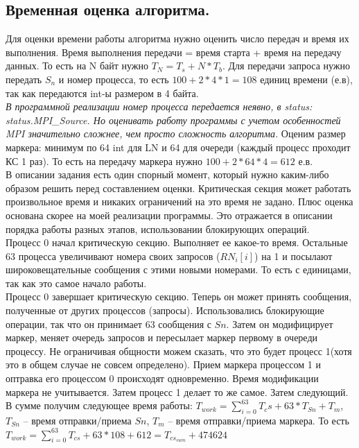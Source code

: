 \documentclass{article}
\begin{document}
\subsection{Временная оценка алгоритма.}
Для оценки времени работы алгоритма нужно оценить число передач и время их выполнения. Время выполнения передачи = время старта + время на передачу данных. То есть на N байт нужно $T_N = T_s + N * T_b$. Для передачи запроса нужно передать $S_n$ и номер процесса, то есть $100 + 2 * 4 * 1 = 108$ единиц времени (е.в), так как передаются int-ы размером в 4 байта.\\ \textit{В программной реализации номер процесса передается неявно, в status: status.MPI\_Source. Но оценивать работу программы с учетом особенностей MPI значительно сложнее, чем просто сложность алгоритма.}
Оценим размер маркера: минимум по 64 int для LN и 64 для очереди (каждый процесс проходит КС 1 раз). То есть на передачу маркера нужно $100 + 2 * 64 * 4 = 612$ е.в.\\
В описании задания есть один спорный момент, который нужно каким-либо образом решить перед составлением оценки. Критическая секция может работать произвольное время и никаких ограничений на это время не задано. Плюс оценка основана скорее на моей реализации программы. Это отражается в описании порядка работы разных этапов, использовании блокирующих операций.\\
Процесс 0 начал критическую секцию. Выполняет ее какое-то время. Остальные 63 процесса увеличивают номера своих запросов ($RN_i[i]$) на 1 и посылают широковещательные сообщения с этими новыми номерами. То есть с единицами, так как это самое начало работы.\\
Процесс 0 завершает критическую секцию. Теперь он может принять сообщения, полученные от других процессов (запросы). Использовались блокирующие операции, так что он принимает 63 сообщения с $Sn$. Затем он модифицирует маркер, меняет очередь запросов и пересылает маркер первому в очереди процессу. Не ограничивая общности можем сказать, что это будет процесс 1(хотя это в общем случае не совсем определено). Прием маркера процессом 1 и оптравка его процессом 0 происходят одновременно. Время модификации маркера не учитывается. Затем процесс 1 делает то же самое. Затем следующий. В сумме получим следующее время работы: $T_{work} = \sum\limits_{i=0}^{63} T_cs + 63 * T_{Sn} + T_m$, $T_{Sn}$ -- время отправки/приема $Sn$, $T_m$ -- время отправки/приема маркера. То есть $T_{work} = \sum\limits_{i=0}^{63} T_{cs} + 63 * 108 + 612 = T_{cs_{sum}} + 474624$
\end{document}
